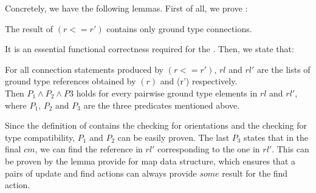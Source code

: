 {%
Concretely, we have the following lemmas.
First of all, we prove :
\begin{lemma}
 The result of \expandconnects $(r<=r')$ contains only ground type connections.
\end{lemma}
It is an essential functional correctness required for the {\expandconnects}.
Then, we state that:
\begin{lemma}\label{p1-p3}
For all connection statements produced by \expandconnects $(r<=r')$, $rl$ and $rl'$ are the lists of ground type references obtained by \expandref$(r)$ and \expandref(r') respectively.\\
Then $P_1\wedge P_2 \wedge P3$ holds for every pairwise ground type elements in $rl$ and $rl'$, where $P_1$, $P_2$ and $P_3$ are the three predicates mentioned above.
\end{lemma}
Since the definition of {\expandconnects} 
contains the checking for orientations and 
the checking for type compatibility, $P_1$ and $P_2$ can be easily proven.
The last $P_3$ states that in the final $cm$, we can find the reference in $rl'$ corresponding to the one in $rl'$. This can be proven by the lemma provide for map data structure, which ensures that a pairs of update and find actions can always provide $some$ result for the find action.

}

